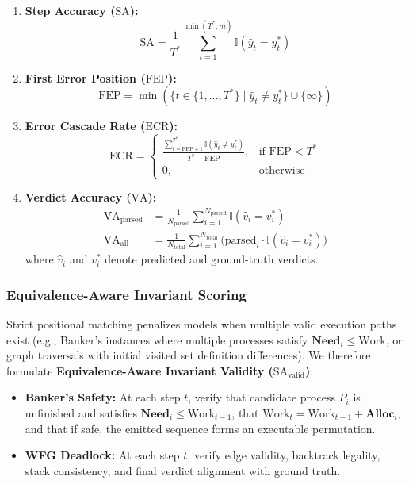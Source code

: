 \documentclass[conference]{IEEEtran}
\newcommand{\SA}{\text{SA}}
\newcommand{\FEP}{\text{FEP}}
\newcommand{\ECR}{\text{ECR}}
\newcommand{\VA}{\text{VA}}
\newcommand{\SAvalid}{\text{SA}_{\text{valid}}}
\begin{document}
\begin{enumerate}
\item \textbf{Step Accuracy ($\SA$):}
  \begin{equation}
    \SA = \frac{1}{T^*} \sum_{t=1}^{\min(T^*,m)} \mathbb{I}(\hat{y}_t = y_t^*)
  \end{equation}

\item \textbf{First Error Position ($\FEP$):}
  \begin{equation}
    \FEP = \min\!\left(\bigl\{t \in \{1,\dots,T^*\} \mid \hat{y}_t \ne y_t^*\bigr\}
             \cup \{\infty\}\right)
  \end{equation}

\item \textbf{Error Cascade Rate ($\ECR$):}
  \begin{equation}
    \ECR = \begin{cases}
      \frac{\sum_{t=\FEP+1}^{T^*} \mathbb{I}(\hat{y}_t \ne y_t^*)}{T^* - \FEP}, & \text{if } \FEP < T^* \\[4pt]
      0, & \text{otherwise}
    \end{cases}
  \end{equation}

\item \textbf{Verdict Accuracy ($\VA$):}
  \begin{align}
    \VA_{\text{parsed}} &= \frac{1}{N_{\text{parsed}}}
      \sum_{i=1}^{N_{\text{parsed}}} \mathbb{I}(\hat{v}_i = v_i^*)\\
    \VA_{\text{all}} &= \frac{1}{N_{\text{total}}}
      \sum_{i=1}^{N_{\text{total}}} \bigl(\text{parsed}_i \cdot \mathbb{I}(\hat{v}_i = v_i^*)\bigr)
  \end{align}
  where $\hat{v}_i$ and $v_i^*$ denote predicted and ground-truth verdicts.
\end{enumerate}

\subsubsection{Equivalence-Aware Invariant Scoring}

Strict positional matching penalizes models when multiple valid execution paths exist
(e.g., Banker's instances where multiple processes satisfy $\mathbf{Need}_i \le \text{Work}$,
or graph traversals with initial visited set definition differences). We therefore formulate
\textbf{Equivalence-Aware Invariant Validity ($\SAvalid$)}:
\begin{itemize}
\item \textbf{Banker's Safety:} At each step $t$, verify that candidate process $P_i$ is unfinished and satisfies $\mathbf{Need}_i \le \text{Work}_{t-1}$, that $\text{Work}_t = \text{Work}_{t-1} + \mathbf{Alloc}_i$, and that if safe, the emitted sequence forms an executable permutation.
\item \textbf{WFG Deadlock:} At each step $t$, verify edge validity, backtrack legality, stack consistency, and final verdict alignment with ground truth.
\end{itemize}
\end{document}
